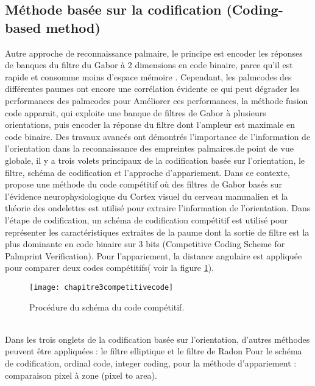 {{\subsection{Méthode basée sur la codification (Coding-based method)}
Autre approche de reconnaissance palmaire, le principe est encoder les réponses de banques du filtre du Gabor  à 2 dimensions en code binaire, parce qu’il est rapide et consomme moins d’espace mémoire \citep{yue2010survey}. Cependant, les palmcodes des différentes paumes ont encore une corrélation évidente ce qui peut dégrader les performances des palmcodes pour Améliorer ces performances, la méthode fusion code apparait, qui exploite une banque de filtres de Gabor à plusieurs orientations, puis encoder la réponse du filtre dont l’ampleur est maximale en code binaire.
Des travaux avancés ont démontrés l’importance de l’information de l’orientation dans la reconnaissance des empreintes palmaires.de point de vue globale, il y a trois volets principaux de la codification basée sur l’orientation, le filtre, schéma de codification et l’approche d’appariement. Dans ce contexte,\citep{kong2004competitive} propose une méthode du code compétitif  où des filtres de Gabor basés sur l’évidence neurophysiologique du Cortex visuel du cerveau mammalien et la théorie des ondelettes  est utilisé pour extraire l’information de l’orientation. Dans l’étape de codification, un schéma de codification compétitif est utilisé pour représenter les caractéristiques extraites de la paume dont la sortie de filtre est la plus dominante en code binaire sur 3 bits (Competitive Coding Scheme for Palmprint Verification). Pour l’appariement, la distance angulaire est appliquée pour comparer deux codes compétitifs( voir la figure \ref{fig:chapitre3competitivecode}).
\begin{center}
	\begin{figure}[H]
		\centering
		 \texttt{[image: chapitre3competitivecode]}
		\caption{Procédure du schéma du code compétitif.}
		\label{fig:chapitre3competitivecode}
	\end{figure}
\end{center}
 \\Dans les trois onglets de la codification basée sur l’orientation, d’autres méthodes peuvent être appliquées : le filtre elliptique et le filtre de Radon 
Pour le schéma de codification, ordinal code, integer coding, pour la méthode d’appariement : comparaison pixel à zone (pixel to area)\citep{zhang2012comparative}.
}}
